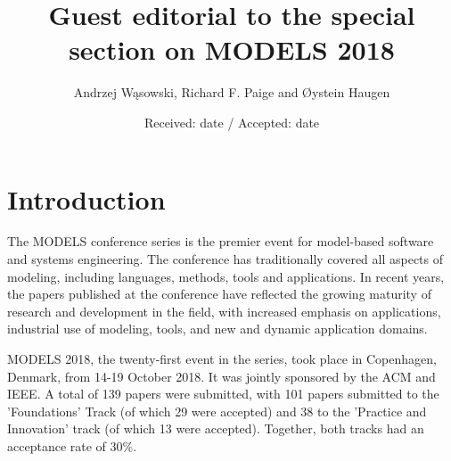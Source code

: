 \documentclass{svjour3}                     %
\begin{document}
\title{Guest editorial to the special section on MODELS 2018}


\author{Andrzej W\k{a}sowski, Richard F. Paige and \O ystein Haugen}



\date{Received: date / Accepted: date}


\maketitle

\section{Introduction}

The MODELS conference series is the premier event for model-based software and systems engineering. The conference
has traditionally covered all aspects of modeling, including languages, methods, tools and applications. In recent years,
the papers published at the conference have reflected the growing maturity of research and development in the field, with increased
emphasis on applications, industrial use of modeling, tools, and new and dynamic application domains. 

MODELS 2018, the twenty-first event in the series, took place in Copenhagen, Denmark, from 14-19 October 2018. It was jointly sponsored
by the ACM and IEEE. A total of 139 papers were submitted, with 101 papers submitted to the 'Foundations' Track (of which 29 were
accepted) and 38 to the 'Practice and Innovation' track (of which 13 were accepted). Together, both tracks had an acceptance rate of
30\%.
\end{document}
